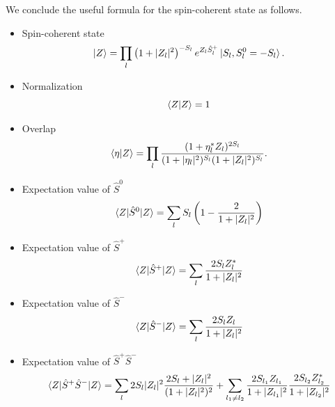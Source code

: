 \documentclass[11pt]{book} %
\begin{document}
We conclude the useful formula for the spin-coherent state as follows.
\begin{framed}
  \begin{itemize}
 \item Spin-coherent state 
\begin{equation}
	\ket{Z} = \prod_{l} \left(1+|Z_l|^2\right)^{-S_l}
	e^{Z_l \hat{S}_l^{+}} \ket{S_l, S_l^0=-S_l} .
 \label{coherent}
\end{equation}
 \item Normalization
\begin{equation}
	\braket{Z|Z} = 1
\end{equation}
 \item Overlap
\begin{equation}
	  \braket{\eta|Z} = \prod_l \frac{(1+\eta_l^*Z_l)^{2S_l}}{(1+|\eta_l|^2)^{S_l}(1+|Z_l|^2)^{S_l}} .
  \label{overlap}
\end{equation}
 \item Expectation value of $\hat{S}^0$
\begin{equation}
     \braket{Z|\hat{S}^0|Z} = \sum_l S_l\left( 1-\frac{2}{1+|Z_l|^2} \right)
\end{equation}
 \item Expectation value of $\hat{S}^+$
\begin{equation}
     \braket{Z|\hat{S}^+|Z} = \sum_l \frac{2S_lZ_l^*}{1+|Z_l|^2}
\end{equation}
 \item Expectation value of $\hat{S}^-$
\begin{equation}
     \braket{Z|\hat{S}^-|Z} = \sum_l \frac{2S_lZ_l}{1+|Z_l|^2}
\end{equation}
 \item Expectation value of $\hat{S}^+\hat{S}^-$
\begin{equation}
    \braket{Z|\hat{S}^+\hat{S}^-|Z} = \sum_l 2S_l|Z_l|^2\frac{2S_l+|Z_l|^2}{(1+|Z_l|^2)^2}
    + \sum_{l_1 \neq l_2} \frac{2S_{l_1}Z_{l_1}}{1+|Z_{l_1}|^2}\frac{2S_{l_2}Z_{l_2}^*}{1+|Z_{l_2}|^2}
\end{equation}
\end{itemize}
\end{framed}
\end{document}
